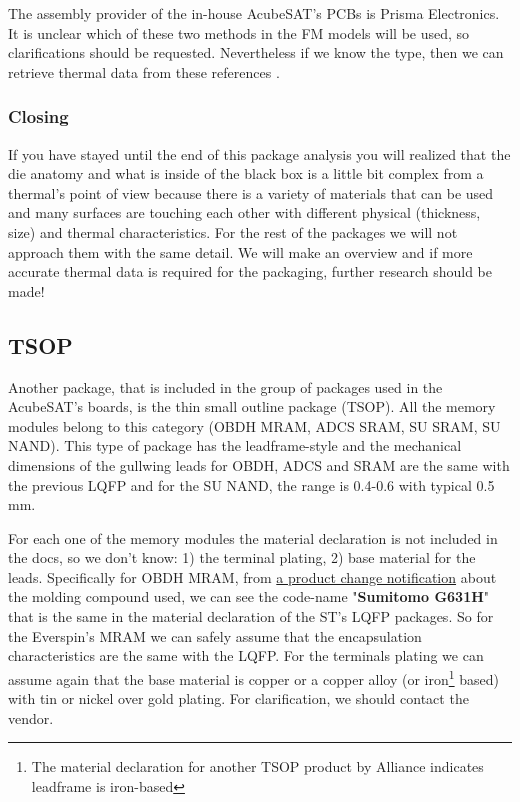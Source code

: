\documentclass[final]{cubedoc}
\begin{document}
	The assembly provider of the in-house AcubeSAT's PCBs is Prisma Electronics. It is unclear which of these two methods in the FM models will be used, so clarifications should be requested. Nevertheless if we know the type, then we can retrieve thermal data from these references \cite{solder, wiki:solderalloys, propemetalengedge}.
	
	
	\subsubsection{Closing}
	
	
	If you have stayed until the end of this package analysis you will realized that the die anatomy and what is inside of the black box is a little bit complex from a thermal's point of view because there is a variety of materials that can be used and many surfaces are touching each other with different physical (thickness, size) and thermal characteristics. For the rest of the packages we will not approach them with the same detail. We will make an overview and if more accurate thermal data is required for the packaging, further research should be made!
	
	
	\subsection{TSOP}
	
	
	
	Another package, that is included in the group of packages used in the AcubeSAT's boards, is the thin small outline package (TSOP). All the memory modules belong to this category (OBDH MRAM, ADCS SRAM, SU SRAM, SU NAND). This type of package has the leadframe-style and  the mechanical dimensions of the gullwing leads for OBDH, ADCS and SRAM are the same with the previous LQFP and for the SU NAND, the range is 0.4-0.6 with typical 0.5 mm. 
	
	For each one of the memory modules the material declaration is not included in the docs, so we don't know: 1) the terminal plating, 2) base material for the leads. Specifically for OBDH MRAM, from \href{https://www.everspin.com/supportdocs/MR0A16AYS35R?npath=}{a product change notification} about the molding compound used, we can see the code-name "\textbf{Sumitomo G631H}" that is the same in the material declaration of the ST's LQFP packages. So for the Everspin's MRAM we can safely assume that the encapsulation characteristics are the same with the LQFP. For the terminals plating we can assume again that the base material is copper or a copper alloy (or iron\footnote{The material declaration \cite{alliancematdoc} for another TSOP product by Alliance indicates leadframe is iron-based} based) with tin or nickel over gold plating. For clarification, we should contact the vendor.
	
\end{document}
